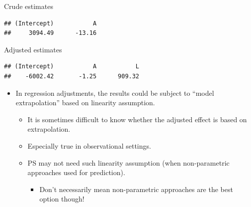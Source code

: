 \documentclass[
]{book}
\newenvironment{Shaded}{\begin{snugshade}}{\end{snugshade}}
\newcommand{\AttributeTok}[1]{\textcolor[rgb]{0.77,0.63,0.00}{#1}}
\newcommand{\DecValTok}[1]{\textcolor[rgb]{0.00,0.00,0.81}{#1}}
\newcommand{\FunctionTok}[1]{\textcolor[rgb]{0.00,0.00,0.00}{#1}}
\newcommand{\NormalTok}[1]{#1}
\newcommand{\OtherTok}[1]{\textcolor[rgb]{0.56,0.35,0.01}{#1}}
\newcommand{\SpecialCharTok}[1]{\textcolor[rgb]{0.00,0.00,0.00}{#1}}
\newcommand{\StringTok}[1]{\textcolor[rgb]{0.31,0.60,0.02}{#1}}
\providecommand{\tightlist}{%
  \setlength{\itemsep}{0pt}\setlength{\parskip}{0pt}}
\begin{document}
Crude estimates

\begin{Shaded}
\end{Shaded}

\begin{verbatim}
## (Intercept)           A 
##     3094.49      -13.16
\end{verbatim}

Adjusted estimates

\begin{Shaded}
\end{Shaded}

\begin{verbatim}
## (Intercept)           A           L 
##    -6002.42       -1.25      909.32
\end{verbatim}

\begin{itemize}
\tightlist
\item
  In regression adjustments, the results could be subject to ``model extrapolation'' based on linearity assumption.

  \begin{itemize}
  \tightlist
  \item
    It is sometimes difficult to know whether the adjusted effect is based on extrapolation.
  \item
    Especially true in observational settings.
  \item
    PS may not need such linearity assumption (when non-parametric approaches used for prediction).

    \begin{itemize}
    \tightlist
    \item
      Don't necessarily mean non-parametric approaches are the best option though!
    \end{itemize}
  \end{itemize}
\end{itemize}
\end{document}
